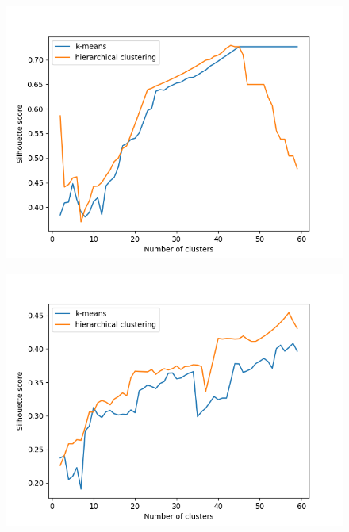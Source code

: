 \documentclass{article}
\begin{document}
\begin{figure}
	\centering
	\begin{minipage}{0.45\linewidth}
	     \includegraphics[width=\linewidth]{CoreDocumentImpl_silhouette_scores.png}
	      \label{fig:subfig1}
	\end{minipage}
	\begin{minipage}{0.45\linewidth}
	    \includegraphics[width=\linewidth]{DTDGrammar_silhouette_scores.png}
	    \label{fig:subfig2}
        \end{minipage} \\	
	\begin{minipage}{0.45\linewidth}

\end{minipage}
\end{figure}
\end{document}
